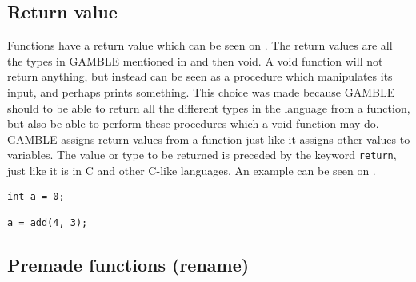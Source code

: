 \subsection{Return value}
Functions have a return value which can be seen on .
The return values are all the types in GAMBLE mentioned in  and then void. 
A void function will not return anything, but instead can be seen as a procedure which manipulates its input, and perhaps prints something.
This choice was made because GAMBLE should to be able to return all the different types in the language from a function, but also be able to perform these procedures which a void function may do.
GAMBLE assigns return values from a function just like it assigns other values to variables.
The value or type to be returned is preceded by the keyword \texttt{return}, just like it is in C and other C-like languages.
An example can be seen on .

\begin{lstlisting}[label=returnFunction]
int a = 0;

a = add(4, 3);
\end{lstlisting}

\subsection{Premade functions (rename)} 

%



